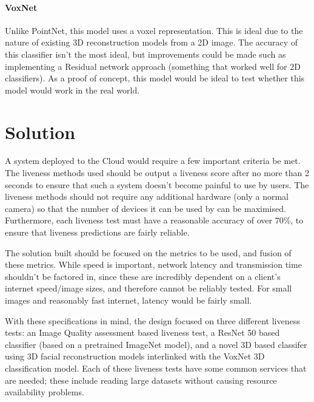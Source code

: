 \documentclass[11pt,a4paper]{article}
\begin{document}
            \paragraph{VoxNet}
                Unlike PointNet, this model uses a voxel representation. This is ideal due to the nature of existing 3D reconstruction models from a 2D image. The accuracy of this classifier isn't the most ideal,
                but improvements could be made such as implementing a Residual network approach (something that worked well for 2D classifiers). As a proof of concept, this model would be ideal to test whether this model would work
                in the real world. \cite{VoxNetModel}
            
\section{Solution}

    A system deployed to the Cloud would require a few important criteria be met. The liveness methods used should be output a liveness score after no more than 2 seconds
    to ensure that such a system doesn't become painful to use by users. The liveness methods should not require any additional hardware (only a normal camera) so that the number
    of devices it can be used by can be maximised. Furthermore, each liveness test must have a reasonable accuracy of over 70\%, to ensure that liveness predictions are fairly reliable.

    The solution built should be focused on the metrics to be used, and fusion of these metrics. While speed is important, network latency and transmission time shouldn't be factored in, 
    since these are incredibly dependent on a client's internet speed/image sizes, and therefore cannot be reliably tested. For small images and reasonably fast internet, latency would be fairly small.

    With these specifications in mind, the design focused on three different liveness tests: an Image Quality assessment based liveness test, a ResNet 50 based classifier (based on a pretrained ImageNet model),
    and a novel 3D based classifer using 3D facial reconstruction models interlinked with the VoxNet 3D classification model. Each of these liveness tests have some common services that are needed; these include
    reading large datasets without causing resource availability problems.
\end{document}
